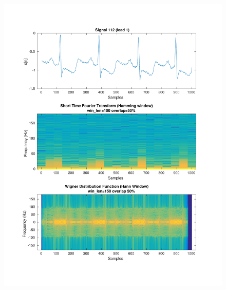 \documentclass[11pt,a4paper]{article}
\begin{document}
\begin{figure}[H]
\centering
\begin{minipage}{0.48\textwidth}
	\centering
	\includegraphics[width=\textwidth]{fig/112l1_stft_wdf.pdf}
\end{minipage}
\begin{minipage}{0.48\textwidth}
	\centering

\end{minipage}
\end{figure}
\end{document}
